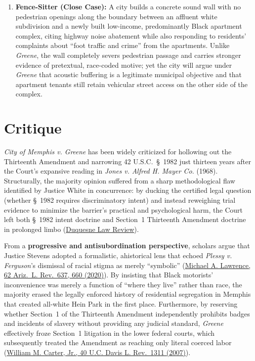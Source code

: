 \documentclass[12pt]{article}
\begin{document}
\begin{enumerate}
  \item \textbf{Fence-Sitter (Close Case):} A city builds a concrete sound wall with no pedestrian openings along the boundary between an affluent white subdivision and a newly built low-income, predominantly Black apartment complex, citing highway noise abatement while also responding to residents' complaints about ``foot traffic and crime'' from the apartments. Unlike \textit{Greene}, the wall completely severs pedestrian passage and carries stronger evidence of pretextual, race-coded motive; yet the city will argue under \textit{Greene} that acoustic buffering is a legitimate municipal objective and that apartment tenants still retain vehicular street access on the other side of the complex.
\end{enumerate}

\section{Critique}

\textit{City of Memphis v. Greene} has been widely criticized for hollowing out the Thirteenth Amendment and narrowing 42 U.S.C.\ \S~1982 just thirteen years after the Court's expansive reading in \textit{Jones v. Alfred H. Mayer Co.} (1968). Structurally, the majority opinion suffered from a sharp methodological flaw identified by Justice White in concurrence: by ducking the certified legal question (whether \S~1982 requires discriminatory intent) and instead reweighing trial evidence to minimize the barrier's practical and psychological harm, the Court left both \S~1982 intent doctrine and Section~1 Thirteenth Amendment doctrine in prolonged limbo (\href{https://dsc.duq.edu/cgi/viewcontent.cgi?article=2263&context=dlr}{Duquesne Law Review}).

From a \textbf{progressive and antisubordination perspective}, scholars argue that Justice Stevens adopted a formalistic, ahistorical lens that echoed \textit{Plessy v. Ferguson}'s dismissal of racial stigma as merely ``symbolic'' (\href{https://arizonalawreview.org/pdf/62-3/62arizlrev637.pdf}{Michael A. Lawrence, 62 Ariz.\ L. Rev.\ 637, 660 (2020)}). By insisting that Black motorists' inconvenience was merely a function of ``where they live'' rather than race, the majority erased the legally enforced history of residential segregation in Memphis that created all-white Hein Park in the first place. Furthermore, by reserving whether Section~1 of the Thirteenth Amendment independently prohibits badges and incidents of slavery without providing any judicial standard, \textit{Greene} effectively froze Section~1 litigation in the lower federal courts, which subsequently treated the Amendment as reaching only literal coerced labor (\href{https://lawreview.law.ucdavis.edu/sites/g/files/dgvnsk15026/files/media/documents/DavisVol40No4_Carter.pdf}{William M. Carter, Jr., 40 U.C. Davis L. Rev.\ 1311 (2007)}).
\end{document}
